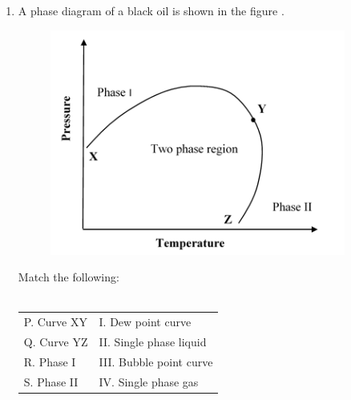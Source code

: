 \documentclass[journal,12pt,onecolumn]{IEEEtran}
\theoremstyle{remark}
\begin{document}
\begin{enumerate}
\hfill{}

\begin{enumerate}
\end{enumerate}

\pagebreak

\item A phase diagram of a black oil is shown in the figure .

\hfill{}

\begin{figure}[h!]
  \centering
  \includegraphics[width=0.6\columnwidth]{figs/pic2.png} 
   \caption*{}
  \label{fig:Q15}
\end{figure}

\noindent
Match the following:\\\\

\begin{tabular}{ll}
P. Curve XY & I. Dew point curve\\
Q. Curve YZ & II. Single phase liquid\\
R. Phase I  & III. Bubble point curve\\
S. Phase II &  IV. Single phase gas
\end{tabular}

\begin{enumerate}
\end{enumerate}



\end{enumerate}
\end{document}
